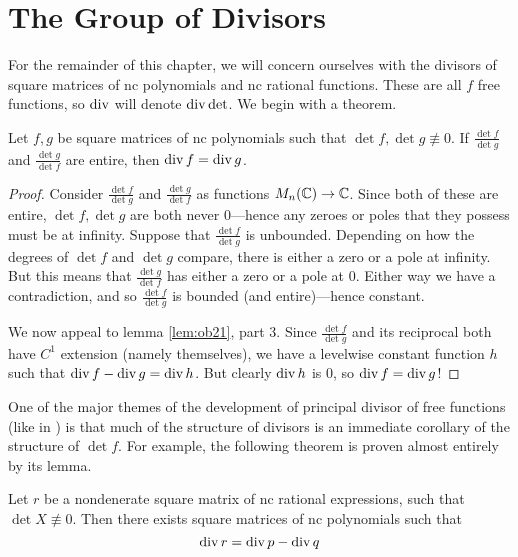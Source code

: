 \section{The Group of Divisors}%
\label{sec:divpoly}

For the remainder of this chapter, we will concern ourselves with the divisors
of square matrices of nc polynomials and nc rational functions. These are all
\(f\) free functions, so \(\operatorname{div}\) will denote \(\operatorname{div} \det\). We begin with a
theorem.

\begin{theorem}
  Let \(f,g\) be square matrices of nc polynomials such that
  \(\det f, \det g \not\equiv 0\). If \(\frac{\det f}{\det g}\) and
  \(\frac{\det g}{\det f}\) are entire, then \(\operatorname{div} f = \operatorname{div} g\).
\end{theorem}

\begin{proof}
  Consider \(\frac{\det f}{\det g}\) and \(\frac{\det g}{\det f}\) as functions
  \(M_n(\mathbb{C})\to \mathbb{C} \). Since both of these are entire, \(\det f, \det g\) are
  both never 0---hence any zeroes or poles that they possess must be at
  infinity. Suppose that \(\frac{\det f}{\det g}\) is unbounded. Depending on how
  the degrees of \(\det f\) and \(\det g\) compare, there is either a zero or a
  pole at infinity. But this means that \(\frac{\det g}{\det f}\) has either a
  zero or a pole at \(0\). Either way we have a contradiction, and so
  \(\frac{\det f}{\det g}\) is bounded (and entire)---hence constant.

  We now appeal to lemma \ref{lem:ob21}, part 3. Since \(\frac{\det f}{\det g}\)
  and its reciprocal both have \(C^1\) extension (namely themselves), we have a
  levelwise constant function \(h\) such that \(\operatorname{div} f - \operatorname{div} g = \operatorname{div} h\).
  But clearly \(\operatorname{div} h\) is 0, so \(\operatorname{div} f = \operatorname{div} g\)!
\end{proof}

One of the major themes of the development of principal divisor of free
functions (like in \cite{pascoeFreeNoncommutativePrincipal2020}) is that much of
the structure of divisors is an immediate corollary of the structure of
\(\det f\). For example, the following theorem is proven almost entirely by its
lemma.

\begin{theorem}
  Let \(r\) be a nondenerate square matrix of nc rational expressions, such that
  \(\det X \not\equiv 0 \). Then there exists square matrices of nc polynomials
  such that
  \[
    \operatorname{div} r = \operatorname{div} p - \operatorname{div} q
  \]
\end{theorem}

